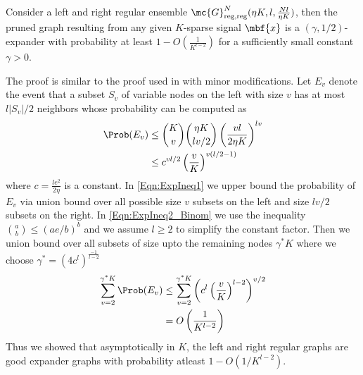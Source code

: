 \documentclass[conference]{IEEEtran}
\begin{document}
\begin{lemma}\label{Lem:ExpGraph}
Consider a left and right regular ensemble $\mc{G}^{N}_{\text{reg,reg}}(\eta K,l,\frac{Nl}{\eta K})$, then the pruned graph resulting from any given $K$-sparse signal $\mbf{x}$ is a $(\gamma,1/2)$-expander with probability at least $1-O\left(\frac{1}{K^{l-2}}\right)$ for a sufficiently small constant $\gamma >0$.
\end{lemma}
\begin{IEEEproof}
The proof is similar to the proof used in \cite{li2015subdraft} with minor modifications. Let $E_{v}$ denote the event that a subset $S_{v}$ of variable nodes on the left with size $v$ has at most $l|S_v|/2$ neighbors whose probability can be computed as
\begin{align}
\Prob(E_v)&\leq \binom{K}{v}\binom{\eta K}{lv/2}\left(\frac{vl}{2\eta K}\right)^{lv}\label{Eqn:ExpIneq1}\\
				&\leq c^{vl/2}\left(\frac{v}{K}\right)^{v(l/2-1)}\label{Eqn:ExpIneq2_Binom}
\end{align}
where $c=\frac{le^{2}}{2\eta}$ is a constant. In \eqref{Eqn:ExpIneq1} we upper bound the probability of $E_v$ via union bound over all possible size $v$ subsets on the left and size $lv/2$ subsets on the right. In \eqref{Eqn:ExpIneq2_Binom} we use the inequality $\binom{a}{b}\leq \left(ae/b\right)^b$ and we assume $l\geq 2$ to simplify the constant factor. Then we union bound over all subsets of size upto the remaining nodes $\gamma^{*} K$ where we choose $\gamma^{*}=\left(4c^l\right)^{\frac{-1}{l-2}}$
\begin{align*}
\sum_{v=2}^{\gamma^{*} K}\Prob(E_{v})&\leq \sum_{v=2}^{\gamma^{*} K}\left(c^{l}\left(\frac{v}{K}\right)^{l-2}\right)^{v/2}\\
														&=O\left(\frac{1}{K^{l-2}}\right)
\end{align*}
Thus we showed that asymptotically in $K$, the left and right regular graphs are good expander graphs with probability atleast $1-O(1/K^{l-2}).$
\end{IEEEproof}
\vspace{1ex}
\end{document}
